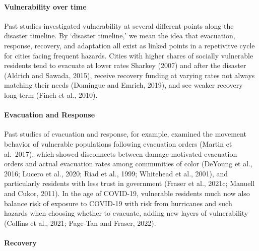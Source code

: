 \documentclass[]{elsarticle} %
\begin{document}
\hypertarget{vulnerability-over-time}{%
\paragraph{Vulnerability over time}\label{vulnerability-over-time}}

Past studies investigated vulnerability at several different points
along the disaster timeline. By `disaster timeline,' we mean the idea
that evacuation, response, recovery, and adaptation all exist as linked
points in a repetivitve cycle for cities facing frequent hazards. Cities
with higher shares of socially vulnerable residents tend to evacuate at
lower rates Sharkey (2007) and after the disaster (Aldrich and Sawada,
2015), receive recovery funding at varying rates not always matching
their needs (Domingue and Emrich, 2019), and see weaker recovery
long-term (Finch et al., 2010).

\hypertarget{evacuation-and-response}{%
\paragraph{Evacuation and Response}\label{evacuation-and-response}}

Past studies of evacuation and response, for example, examined the
movement behavior of vulnerable populations following evacuation orders
(Martin et al.~2017), which showed disconnects between damage-motivated
evacuation orders and actual evacuation rates among communities of color
(DeYoung et al., 2016; Lucero et al., 2020; Riad et al., 1999; Whitehead
et al., 2001), and particularly residents with less trust in government
(Fraser et al., 2021c; Manuell and Cukor, 2011). In the age of COVID-19,
vulnerable residents much now also balance risk of exposure to COVID-19
with risk from hurricanes and such hazards when choosing whether to
evacuate, adding new layers of vulnerability (Collins et al., 2021;
Page-Tan and Fraser, 2022).

\hypertarget{recovery}{%
\paragraph{Recovery}\label{recovery}}
\end{document}
